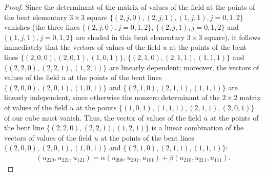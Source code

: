 \documentclass[11pt]{article}
\begin{document}
\begin{proof}
Since the determinant of the matrix of values of the f\/ield at the
points of the bent elementary $3 \times 3$ square $\{(2, j, 0), (2,
j, 1), (1, j, 1), j = 0, 1, 2\}$ vanishes (the three lines $\{(2, j,
0), j = 0, 1, 2\}$, $\{(2, j, 1), j = 0, 1, 2\}$ and $\{(1, j, 1), j
= 0, 1, 2\}$ are shaded in this bent elementary $3 \times 3$
square), it follows immediately that the vectors of values of the
f\/ield $u$ at the points of the bent lines $\{(2, 0, 0), (2, 0, 1),
(1, 0, 1)\}$, $\{(2, 1, 0), (2, 1, 1), (1, 1, 1)\}$ and $\{(2, 2,
0), (2, 2, 1), (1, 2, 1)\}$ are linearly dependent; moreover, the
vectors of values of the f\/ield $u$ at the points of the bent lines
$\{(2, 0, 0), (2, 0, 1), (1, 0, 1)\}$ and $\{(2, 1, 0), (2, 1, 1),
(1, 1, 1)\}$ are linearly independent, since otherwise the nonzero
determinant of the $2 \times 2$ matrix of values of the f\/ield $u$ at
the points $\{(1, 0, 1), (1, 1, 1), (2, 1, 1), (2, 0, 1)\}$ of our
cube must vanish. Thus, the vector of values of the f\/ield $u$ at the
points of the bent line $\{(2, 2, 0), (2, 2, 1), (1, 2, 1)\}$ is a
linear combination of the vectors of values of the f\/ield $u$ at the
points of the bent lines $\{(2, 0, 0), (2, 0, 1), (1, 0, 1)\}$ and
$\{(2, 1, 0), (2, 1, 1), (1, 1, 1)\}$: \begin{gather} (u_{2 2 0}, u_{2 2 1},
u_{1 2 1}) = \alpha (u_{2 0 0}, u_{2 0 1}, u_{1 0 1}) + \beta (u_{2
1 0}, u_{2 1 1}, u_{1 1 1}). \label{7xxyb2} \end{gather}



\end{proof}
\end{document}
